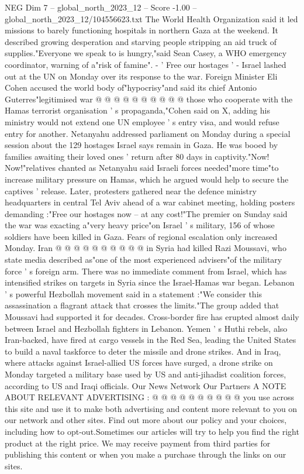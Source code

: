 \begin{textsample}{NEG Dim 7 – global\_north\_2023\_12 – Score -1.00 – global\_north\_2023\_12/104556623.txt}
The World Health Organization said it led missions to barely functioning hospitals in northern Gaza at the weekend.
It described growing desperation and starving people stripping an aid truck of supplies."Everyone we speak to is hungry,"said Sean Casey, a WHO emergency coordinator, warning of a"risk of famine". - ' Free our hostages ' - Israel lashed out at the UN on Monday over its response to the war.
Foreign Minister Eli Cohen accused the world body of"hypocrisy"and said its chief Antonio Guterres"legitimised war @ @ @ @ @ @ @ @ @ @ those who cooperate with the Hamas terrorist organisation ' s propaganda,"Cohen said on X, adding his ministry would not extend one UN employee ' s entry visa, and would refuse entry for another.
Netanyahu addressed parliament on Monday during a special session about the 129 hostages Israel says remain in Gaza.
He was booed by families awaiting their loved ones ' return after 80 days in captivity."Now!
Now!"relatives chanted as Netanyahu said Israeli forces needed"more time"to increase military pressure on Hamas, which he argued would help to secure the captives ' release.
Later, protesters gathered near the defence ministry headquarters in central Tel Aviv ahead of a war cabinet meeting, holding posters demanding :"Free our hostages now -- at any cost!"The premier on Sunday said the war was exacting a"very heavy price"on Israel ' s military, 156 of whose soldiers have been killed in Gaza.
Fears of regional escalation only increased Monday.
Iran @ @ @ @ @ @ @ @ @ @ in Syria had killed Razi Moussavi, who state media described as"one of the most experienced advisers"of the military force ' s foreign arm.
There was no immediate comment from Israel, which has intensified strikes on targets in Syria since the Israel-Hamas war began.
Lebanon ' s powerful Hezbollah movement said in a statement :"We consider this assassination a flagrant attack that crosses the limits."The group added that Moussavi had supported it for decades.
Cross-border fire has erupted almost daily between Israel and Hezbollah fighters in Lebanon.
Yemen ' s Huthi rebels, also Iran-backed, have fired at cargo vessels in the Red Sea, leading the United States to build a naval taskforce to deter the missile and drone strikes.
And in Iraq, where attacks against Israel-allied US forces have surged, a drone strike on Monday targeted a military base used by US and anti-jihadist coalition forces, according to US and Iraqi officials.
Our News Network Our Partners A NOTE ABOUT RELEVANT ADVERTISING : @ @ @ @ @ @ @ @ @ @ you use across this site and use it to make both advertising and content more relevant to you on our network and other sites.
Find out more about our policy and your choices, including how to opt-out.Sometimes our articles will try to help you find the right product at the right price.
We may receive payment from third parties for publishing this content or when you make a purchase through the links on our sites.

\end{textsample}
